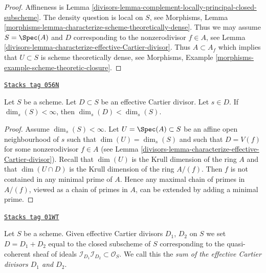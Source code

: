 \begin{proof}

Affineness is Lemma \ref{divisors-lemma-complement-locally-principal-closed-subscheme}.
The density question is local on $S$, see
Morphisms, Lemma \ref{morphisms-lemma-characterize-scheme-theoretically-dense}.
Thus we may assume $S = \Spec(A)$ and $D$ corresponding to the
nonzerodivisor $f \in A$, see
Lemma \ref{divisors-lemma-characterize-effective-Cartier-divisor}.
Thus $A \subset A_f$ which implies that $U \subset S$ is
scheme theoretically dense, see
Morphisms, Example \ref{morphisms-example-scheme-theoretic-closure}.
\end{proof}

\begin{lemma}
\label{divisors-lemma-effective-Cartier-makes-dimension-drop}
\href{https://stacks.math.columbia.edu/tag/056N}{\texttt{Stacks tag 056N}}

Let $S$ be a scheme.
Let $D \subset S$ be an effective Cartier divisor.
Let $s \in D$.
If $\dim_s(S) < \infty$, then $\dim_s(D) < \dim_s(S)$.
\end{lemma}

\begin{proof}

Assume $\dim_s(S) < \infty$.
Let $U = \Spec(A) \subset S$ be an affine open neighbourhood
of $s$ such that $\dim(U) = \dim_s(S)$ and such that $D = V(f)$
for some nonzerodivisor $f \in A$ (see
Lemma \ref{divisors-lemma-characterize-effective-Cartier-divisor}).
Recall that $\dim(U)$ is the Krull dimension of the ring $A$
and that $\dim(U \cap D)$ is the Krull dimension of the ring $A/(f)$.
Then $f$ is not contained in any minimal prime of $A$.
Hence any maximal chain of primes in $A/(f)$, viewed as a chain
of primes in $A$, can be extended by adding a minimal prime.
\end{proof}

\begin{definition}
\label{divisors-definition-sum-effective-Cartier-divisors}
\href{https://stacks.math.columbia.edu/tag/01WT}{\texttt{Stacks tag 01WT}}

Let $S$ be a scheme. Given effective Cartier divisors
$D_1$, $D_2$ on $S$ we set $D = D_1 + D_2$ equal to the
closed subscheme of $S$ corresponding to the quasi-coherent
sheaf of ideals
$\mathcal{I}_{D_1}\mathcal{I}_{D_2} \subset \mathcal{O}_S$.
We call this the {\it sum of the effective Cartier divisors
$D_1$ and $D_2$}.
\end{definition}

